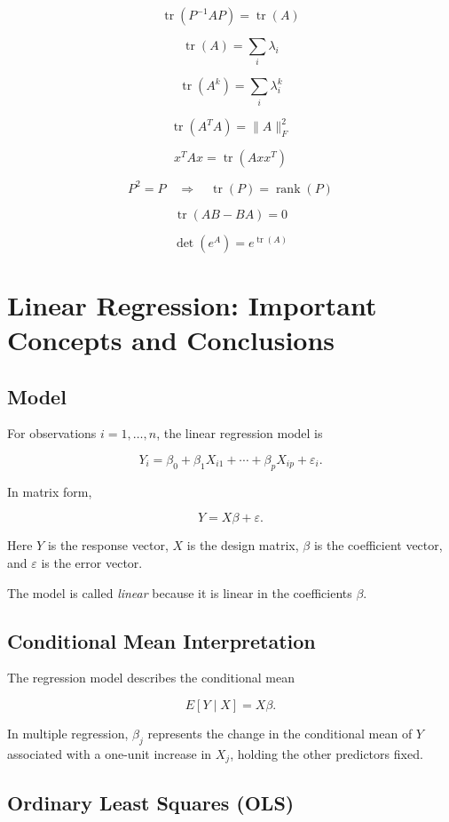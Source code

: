 \documentclass[a4paper,10pt]{article}
\begin{document}
\[
\operatorname{tr}(P^{-1}AP)=\operatorname{tr}(A)
\]

\[
\operatorname{tr}(A)=\sum_i \lambda_i
\]

\[
\operatorname{tr}(A^k)=\sum_i \lambda_i^k
\]

\[
\operatorname{tr}(A^T A)=\lVert A\rVert_F^2
\]

\[
x^T A x=\operatorname{tr}(Axx^T)
\]

\[
P^2=P
\quad\Longrightarrow\quad
\operatorname{tr}(P)=\operatorname{rank}(P)
\]

\[
\operatorname{tr}(AB-BA)=0
\]

\[
\det(e^A)=e^{\operatorname{tr}(A)}
\]

\section{Linear Regression: Important Concepts and Conclusions}

\subsection{Model}

For observations $i=1,\dots,n$, the linear regression model is

\[
Y_i = \beta_0 + \beta_1 X_{i1} + \cdots + \beta_p X_{ip} + \varepsilon_i.
\]

In matrix form,

\[
Y = X\beta + \varepsilon.
\]

Here $Y$ is the response vector, $X$ is the design matrix, $\beta$ is the coefficient vector, and $\varepsilon$ is the error vector.

The model is called \emph{linear} because it is linear in the coefficients $\beta$.

\subsection{Conditional Mean Interpretation}

The regression model describes the conditional mean

\[
E[Y\mid X] = X\beta.
\]

In multiple regression, $\beta_j$ represents the change in the conditional mean of $Y$ associated with a one-unit increase in $X_j$, holding the other predictors fixed.

\subsection{Ordinary Least Squares (OLS)}
\end{document}
